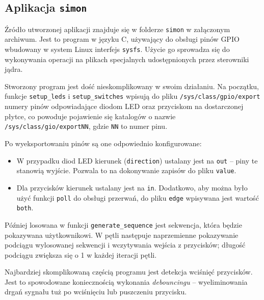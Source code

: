 \documentclass[10pt,a4paper]{article}
\begin{document}
\subsection{Aplikacja \texttt{simon}}

Źródło utworzonej aplikacji znajduje się w folderze \verb+simon+ w załączonym archiwum. Jest to program w języku C, używający do obsługi pinów GPIO wbudowany w system Linux interfejs \verb+sysfs+. Użycie go sprowadza się do wykonywania operacji na plikach specjalnych udostępnionych przez sterowniki jądra.

Stworzony program jest dość nieskomplikowany w swoim działaniu. Na początku, funkcje \verb+setup_leds+ i \verb+setup_switches+ wpisują do pliku \verb+/sys/class/gpio/export+ numery pinów odpowiadające diodom LED oraz przyciskom na dostarczonej płytce, co powoduje pojawienie się katalogów o nazwie \verb+/sys/class/gio/exportNN+, gdzie \verb+NN+ to numer pinu.

Po wyeksportowaniu pinów są one odpowiednio konfigurowane:
\begin{itemize}
	\item W przypadku diod LED kierunek (\verb+direction+) ustalany jest na \verb+out+ -- piny te stanowią wyjście. Pozwala to na dokonywanie zapisów do pliku \verb+value+.
	\item Dla przycisków kierunek ustalany jest na \verb+in+. Dodatkowo, aby można było użyć funkcji \verb+poll+ do obsługi przerwań, do pliku \verb+edge+ wpisywana jest wartość \verb+both+.
\end{itemize}

Później losowana w funkcji \verb+generate_sequence+ jest sekwencja, która będzie pokazywana użytkownikowi. W pętli następuje naprzemienne pokazywanie podciągu wylosowanej sekwencji i wczytywania wejścia z przycisków; długość podciągu zwiększa się o 1 w każdej iteracji pętli.

Najbardziej skomplikowaną częścią programu jest detekcja wciśnięć przycisków. Jest to spowodowane koniecznością wykonania \emph{debouncingu} -- wyeliminowania drgań sygnału tuż po wciśnięciu lub puszczeniu przycisku.
\end{document}
